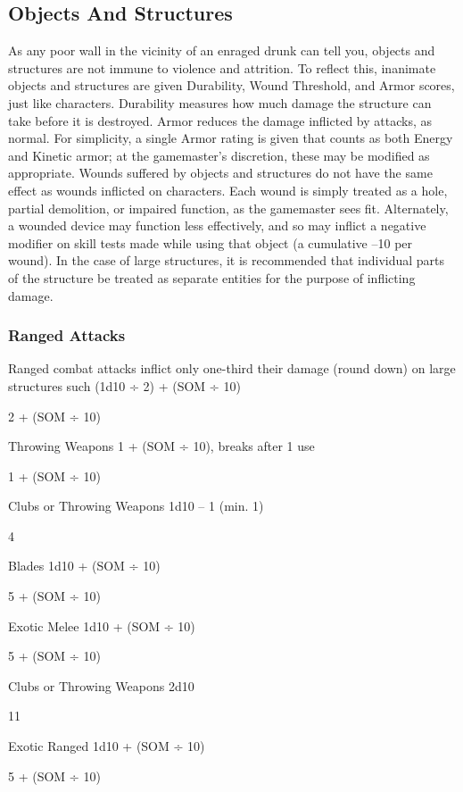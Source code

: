 \subsection{Objects And Structures}

As any poor wall in the vicinity of an enraged drunk 
can tell you, objects and structures are not immune 
to violence and attrition. To reflect this, inanimate 
objects and structures are given Durability, Wound 
Threshold, and Armor scores, just like characters. Durability
measures how much damage the structure can
take before it is destroyed. Armor reduces the damage 
inflicted by attacks, as normal. For simplicity, a single 
Armor rating is given that counts as both Energy and 
Kinetic armor; at the gamemaster's discretion, these 
may be modified as appropriate.
Wounds suffered by objects and structures do not have 
the same effect as wounds inflicted on characters. Each 
wound is simply treated as a hole, partial demolition, or 
impaired function, as the gamemaster sees fit. Alternately, 
a wounded device may function less effectively, and so 
may inflict a negative modifier on skill tests made while 
using that object (a cumulative –10 per wound).
In the case of large structures, it is recommended 
that individual parts of the structure be treated as 
separate entities for the purpose of inflicting damage.

\subsubsection{Ranged Attacks}

Ranged combat attacks inflict only one-third their 
damage (round down) on large structures such 
(1d10 ÷ 2) + (SOM ÷ 10)

2 + (SOM ÷ 10)

Throwing Weapons
1 + (SOM ÷ 10), breaks after 1 use

1 + (SOM ÷ 10)

Clubs or Throwing Weapons
1d10 – 1 (min. 1)

4

Blades
1d10 + (SOM ÷ 10)

5 + (SOM ÷ 10)

Exotic Melee
1d10 + (SOM ÷ 10)

5 + (SOM ÷ 10)

Clubs or Throwing Weapons
2d10

11

Exotic Ranged
1d10 + (SOM ÷ 10)

5 + (SOM ÷ 10)

